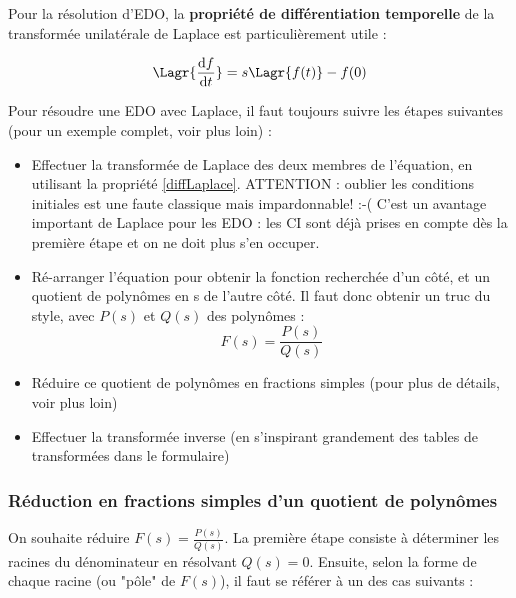 Pour la résolution d'EDO, la \textbf{propriété de différentiation temporelle} de la transformée unilatérale de Laplace est particulièrement utile :

\begin{equation}
\label{diffLaplace}
\Lagr \{ \frac{\mathrm{d}f}{\mathrm{d}t} \} = s \Lagr \{ f(t) \} - f(0)
\end{equation}

Pour résoudre une EDO avec Laplace, il faut toujours suivre les étapes suivantes (pour un exemple complet, voir plus loin) :
\begin{itemize}
\item Effectuer la transformée de Laplace des deux membres de l'équation, en utilisant la propriété \ref{diffLaplace}. ATTENTION : oublier les conditions initiales est une faute classique mais impardonnable! :-( C'est un avantage important de Laplace pour les EDO : les CI sont déjà prises en compte dès la première étape et on ne doit plus s'en occuper.
\item Ré-arranger l'équation pour obtenir la fonction recherchée d'un côté, et un quotient de polynômes en s de l'autre côté. Il faut donc obtenir un truc du style, avec $P(s)$ et $Q(s)$ des polynômes :
$$ F(s) = \frac{P(s)}{Q(s)} $$
\item Réduire ce quotient de polynômes en fractions simples (pour plus de détails, voir plus loin)
\item Effectuer la transformée inverse (en s'inspirant grandement des tables de transformées dans le formulaire)
\end{itemize}

\subsubsection*{Réduction en fractions simples d'un quotient de polynômes}
On souhaite réduire $F(s) = \frac{P(s)}{Q(s)}$. La première étape consiste à déterminer les racines du dénominateur en résolvant $Q(s) = 0$. Ensuite, selon la forme de chaque racine (ou "pôle" de $F(s)$), il faut se référer à un des cas suivants :

